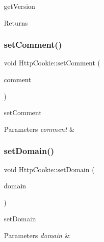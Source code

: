 get\+Version 

\begin{DoxyReturn}{Returns}

\end{DoxyReturn}
\mbox{\label{class_http_cookie_a77e86a49664f147dc359cb9ad8a9013b}} 
\subsubsection{\texorpdfstring{set\+Comment()}{setComment()}}
{\footnotesize\ttfamily void Http\+Cookie\+::set\+Comment (\begin{DoxyParamCaption}\item[{const Q\+Byte\+Array \&}]{comment }\end{DoxyParamCaption})}



set\+Comment 


\begin{DoxyParams}{Parameters}
{\em comment} & \\
\hline
\end{DoxyParams}
\mbox{\label{class_http_cookie_ae4bd49d769fb962399fa1692fe30c8f1}} 
\subsubsection{\texorpdfstring{set\+Domain()}{setDomain()}}
{\footnotesize\ttfamily void Http\+Cookie\+::set\+Domain (\begin{DoxyParamCaption}\item[{const Q\+Byte\+Array \&}]{domain }\end{DoxyParamCaption})}



set\+Domain 


\begin{DoxyParams}{Parameters}
{\em domain} & \\
\hline
\end{DoxyParams}
\mbox{\label{class_http_cookie_a4bee3fe68608752f1bea204a3a6b5134}} 
